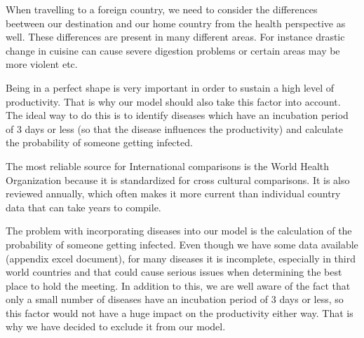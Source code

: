 
When travelling to a foreign country, we need to consider the differences beetween our destination and our home country from the health perspective as well. These differences are present in many different areas. For instance drastic change in cuisine can cause severe digestion problems or certain areas may be more violent etc. 

Being in a perfect shape is very important in order to sustain a high level of productivity. That is why our model should also take this factor into account. The ideal way to do this is to identify diseases which have an incubation period of 3 days or less (so that the disease influences the productivity) and calculate the probability of someone getting infected.

The most reliable source for International comparisons is the World Health Organization because it is standardized for cross cultural comparisons. It is also reviewed annually, which often makes it more current than individual country data that can take years to compile.

The problem with incorporating diseases into our model is the calculation of the probability of someone getting infected. Even though we have some data available (appendix excel document), for many diseases it is incomplete, especially in third world countries and that could cause serious issues when determining the best place to hold the meeting. In addition to this, we are well aware of the fact that only a small number of diseases have an incubation period of 3 days or less, so this factor would not have a huge impact on the productivity either way. That is why we have decided to exclude it from our model.